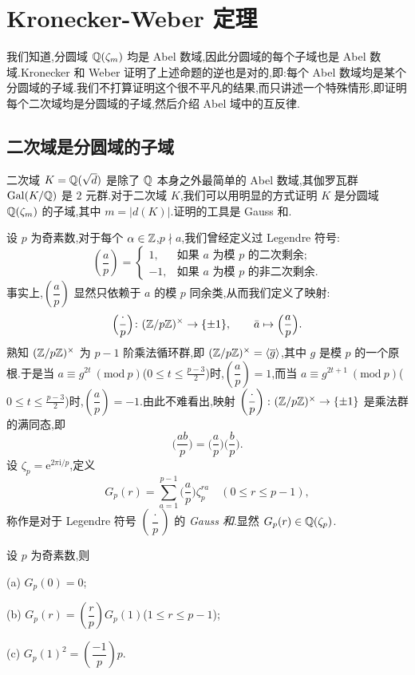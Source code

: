 \section{Kronecker-Weber 定理}\label{sec:ch2-s4}

我们知道,分圆域 $\mathbb{Q}(\zeta_m)$ 均是 Abel 数域,因此分圆域的每个子域也是 Abel 数域.Kronecker 和 Weber 证明了上述命题的逆也是对的,即:每个 Abel 数域均是某个分圆域的子域.我们不打算证明这个很不平凡的结果,而只讲述一个特殊情形,即证明每个二次域均是分圆域的子域,然后介绍 Abel 域中的互反律.

\subsection{二次域是分圆域的子域}\label{sec:ch2-s4-1}

二次域 $K=\mathbb{Q}(\sqrt{d})$ 是除了 $\mathbb{Q}$ 本身之外最简单的 Abel 数域,其伽罗瓦群 $\operatorname{Gal}(K/\mathbb{Q})$ 是 $2$ 元群.对于二次域 $K$,我们可以用明显的方式证明 $K$ 是分圆域 $\mathbb{Q}(\zeta_m)$ 的子域,其中 $m=|d(K)|$.证明的工具是 Gauss 和.

设 $p$ 为奇素数,对于每个 $\alpha\in\mathbb{Z}$,$p\nmid a$,我们曾经定义过 Legendre 符号:
\[
  \left(\frac{a}{p}\right)=\begin{cases}
    1, & \text{如果 } a \text{ 为模 } p \text{ 的二次剩余;}\\
    -1, & \text{如果 } a \text{ 为模 } p \text{ 的非二次剩余.}
  \end{cases}
\]
事实上,$\left(\dfrac{a}{p}\right)$ 显然只依赖于 $a$ 的模 $p$ 同余类,从而我们定义了映射:
\[
  \Big(\frac{\cdot}{p}\Big)\colon(\mathbb{Z}/p\mathbb{Z})^\times\to\{\pm 1\},\qquad \bar{a}\mapsto\Big(\frac{a}{p}\Big).
\]
熟知 $(\mathbb{Z}/p\mathbb{Z})^\times$ 为 $p-1$ 阶乘法循环群,即 $(\mathbb{Z}/p\mathbb{Z})^\times=\langle\overline{g}\rangle$,其中 $g$ 是模 $p$ 的一个原根.于是当 $a\equiv g^{2t}\ (\mathrm{mod}\ p)$($0\leqslant t\leqslant\frac{p-3}{2}$)时,$\left(\dfrac{a}{p}\right)=1$,而当 $a\equiv g^{2t+1}\ (\mathrm{mod}\ p)$($0\leqslant t\leqslant\frac{p-3}{2}$)时,$\left(\dfrac{a}{p}\right)=-1$.由此不难看出,映射 $\left(\dfrac{\cdot}{p}\right)\colon(\mathbb{Z}/p\mathbb{Z})^\times\to\{\pm 1\}$ 是乘法群的满同态,即
\[
  \Big(\frac{ab}{p}\Big)=\Big(\frac{a}{p}\Big)\Big(\frac{b}{p}\Big).
\]
设 $\zeta_p=\mathrm{e}^{2\pi\mathrm{i}/p}$,定义
\[
  G_p(r)=\sum_{a=1}^{p-1}\Big(\frac{a}{p}\Big)\zeta_p^{ra}\quad (0\leqslant r\leqslant p-1),
\]
称作是对于 Legendre 符号 $\left(\dfrac{\cdot}{p}\right)$ 的 \emph{Gauss 和}.显然 $G_p(r)\in\mathbb{Q}(\zeta_p)$.

\begin{theorem}\label{thm:2.15}
设 $p$ 为奇素数,则

(a) $G_p(0)=0$;

(b) $G_p(r)=\left(\dfrac{r}{p}\right)G_p(1)$($1\leqslant r\leqslant p-1$);

(c) $G_p(1)^2=\left(\dfrac{-1}{p}\right)p$.
\end{theorem}

